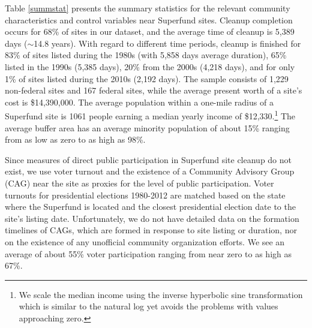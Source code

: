 \documentclass[12pt]{article}
\begin{document}
{Table \ref{summstat} presents the summary statistics for the relevant community characteristics and control variables near Superfund sites. Cleanup completion occurs for 68\% of sites in our dataset, and the average time of cleanup is 5,389 days ($\sim$14.8 years). With regard to different time periods, cleanup is finished for 83\% of sites listed during the 1980s (with 5,858 days average duration), 65\%  listed in the 1990s (5,385 days), 20\% from the 2000s (4,218 days), and for only 1\% of sites listed during the 2010s (2,192 days). The sample consists of 1,229 non-federal sites and 167 federal sites, while the average present worth of a site's cost is \$14,390,000. The average population within a one-mile radius of a Superfund site is 1061 people earning a median yearly income of \$12,330.\footnote{We scale the median income using the inverse hyperbolic sine transformation which is similar to the natural log yet avoids the problems with values approaching zero.} The average buffer area has an average minority population of about 15\% ranging from as low as zero to as high as 98\%.  


Since measures of direct public participation in Superfund site cleanup do not exist, we use voter turnout and the existence of a Community Advisory Group (CAG) near the site as proxies for the level of public participation. Voter turnouts for presidential elections 1980-2012 are matched based on the state where the Superfund is located and the closest presidential election date to the site's listing date. Unfortunately, we do not have detailed data on the formation timelines of CAGs, which are formed in response to site listing or duration, nor on the existence of any unofficial community organization efforts. We see an average of about 55\% voter participation ranging from near zero to as high as 67\%. 

}
\end{document}
